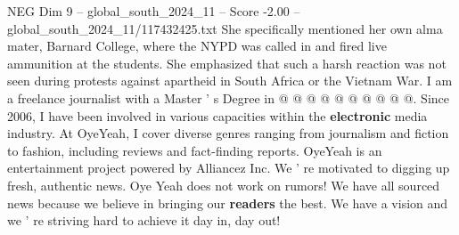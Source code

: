 \begin{textsample}{NEG Dim 9 – global\_south\_2024\_11 – Score -2.00 – global\_south\_2024\_11/117432425.txt}
She specifically mentioned her own alma mater, Barnard College, where the NYPD was called in and fired live ammunition at the students.
She emphasized that such a harsh reaction was not seen during protests against apartheid in South Africa or the Vietnam War.
I am a freelance journalist with a Master ' s Degree in @ @ @ @ @ @ @ @ @ @.
Since 2006, I have been involved in various capacities within the \textbf{electronic} media industry.
At OyeYeah, I cover diverse genres ranging from journalism and fiction to fashion, including reviews and fact-finding reports.
OyeYeah is an entertainment project powered by Alliancez Inc.
We ' re motivated to digging up fresh, authentic news.
Oye Yeah does not work on rumors!
We have all sourced news because we believe in bringing our \textbf{readers} the best.
We have a vision and we ' re striving hard to achieve it day in, day out!

\end{textsample}
